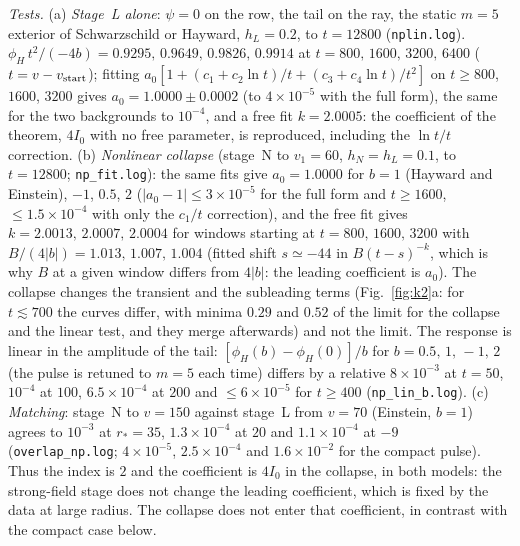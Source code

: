 \documentclass[11pt]{article}
\begin{document}
\emph{Tests.} (a) \emph{Stage~L alone}: $\psi=0$ on the row, the tail on the ray, the static $m=5$ exterior of Schwarzschild or Hayward, $h_L=0.2$, to $t=12800$ (\texttt{nplin.log}). $\phi_H\,t^{2}/(-4b)=0.9295,\,0.9649,\,0.9826,\,0.9914$ at $t=800,\,1600,\,3200,\,6400$ ($t=v-v_{\rm start}$); fitting $a_0[1+(c_1+c_2\ln t)/t+(c_3+c_4\ln t)/t^{2}]$ on $t\ge800$, $1600$, $3200$ gives $a_0=1.0000\pm0.0002$ (to $4\times10^{-5}$ with the full form), the same for the two backgrounds to $10^{-4}$, and a free fit $k=2.0005$: the coefficient of the theorem, $4I_0$ with no free parameter, is reproduced, including the $\ln t/t$ correction. (b) \emph{Nonlinear collapse} (stage~N to $v_1=60$, $h_N=h_L=0.1$, to $t=12800$; \texttt{np\_fit.log}): the same fits give $a_0=1.0000$ for $b=1$ (Hayward and Einstein), $-1$, $0.5$, $2$ ($|a_0-1|\le3\times10^{-5}$ for the full form and $t\ge1600$, $\le1.5\times10^{-4}$ with only the $c_1/t$ correction), and the free fit gives $k=2.0013,\,2.0007,\,2.0004$ for windows starting at $t=800,\,1600,\,3200$ with $B/(4|b|)=1.013,\,1.007,\,1.004$ (fitted shift $s\simeq-44$ in $B(t-s)^{-k}$, which is why $B$ at a given window differs from $4|b|$: the leading coefficient is $a_0$). The collapse changes the transient and the subleading terms (Fig.~\ref{fig:k2}a: for $t\lesssim700$ the curves differ, with minima $0.29$ and $0.52$ of the limit for the collapse and the linear test, and they merge afterwards) and not the limit. The response is linear in the amplitude of the tail: $[\phi_H(b)-\phi_H(0)]/b$ for $b=0.5,\,1,\,-1,\,2$ (the pulse is retuned to $m=5$ each time) differs by a relative $8\times10^{-3}$ at $t=50$, $10^{-4}$ at $100$, $6.5\times10^{-4}$ at $200$ and $\le6\times10^{-5}$ for $t\ge400$ (\texttt{np\_lin\_b.log}). (c) \emph{Matching}: stage~N to $v=150$ against stage~L from $v=70$ (Einstein, $b=1$) agrees to $10^{-3}$ at $r_*=35$, $1.3\times10^{-4}$ at $20$ and $1.1\times10^{-4}$ at $-9$ (\texttt{overlap\_np.log}; $4\times10^{-5}$, $2.5\times10^{-4}$ and $1.6\times10^{-2}$ for the compact pulse). Thus the index is $2$ and the coefficient is $4I_0$ in the collapse, in both models: the strong-field stage does not change the leading coefficient, which is fixed by the data at large radius. The collapse does not enter that coefficient, in contrast with the compact case below.
\end{document}
